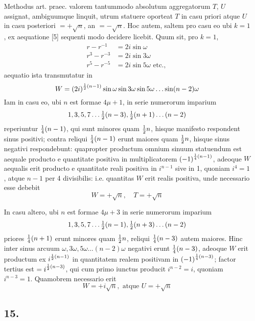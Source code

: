 \documentclass[twoside,12pt]{memoir}
\let\oldfrac\frac
\def\frac#1#2{\mathchoice{\tfrac{#1}{#2}}{\oldfrac{#1}{#2}}{\genfrac{}{}{}{2}{#1}{#2\mathstrut}}{\genfrac{}{}{}{3}{#1}{#2\mathstrut}}}
\begin{document}
Methodus art. praec. valorem tantummodo absolutum aggregatorum \(T\), \(U\) assignat, ambiguumque linquit, utrum statuere oporteat \(T\) in casu priori atque \(U\) in casu posteriori \(=+ \surd n\), an \(=-\surd n\). Hoc autem, saltem pro casu eo ubi \(k=1\), ex aequatione [5] sequenti modo decidere licebit. Quum sit, pro \(k=1\),\pagebreak%
\[\begin{aligned}
r-r^{-1} & =2 i \sin \omega \\
r^{3}-r^{-3} & =2 i \sin 3 \omega \\
r^{5}-r^{-5} & =2 i \sin 5 \omega \text{ etc., }
\end{aligned}\]
aequatio ista transmutatur in
\[W=(2 i)^{\frac{1}{2}(n-1)} \sin \omega \sin 3 \omega \sin 5 \omega \ldots \sin (n-2) \omega\]
Iam in casu eo, ubi \(n\) est formae \(4 \mu+1\), in serie numerorum imparium
\[1,3,5,7 \ldots \frac{1}{2}(n-3), \frac{1}{2}(n+1) \ldots(n-2)\]
reperiuntur \(\frac{1}{4}(n-1)\), qui sunt minores quam \(\frac{1}{2} n\), hisque manifesto respondent sinus positivi; contra reliqui \(\frac{1}{4}(n-1)\) erunt maiores quam \(\frac{1}{2} n\), hisque sinus negativi respondebunt: quapropter productum omnium sinuum statuendum est aequale producto e quantitate positiva in multiplicatorem \((-1)^{\frac{1}{4}(n-1)}\), adeoque \(W\) aequalis erit producto e quantitate reali positiva in \(i^{n-1}\) sive in 1, quoniam \(i^{4}=1\), atque \(n-1\) per 4 divisibilis: i.e. quantitas \(W\) erit realis positiva, unde necessario esse debebit
\[W=+\surd n, \quad T=+\surd n\]

In casu altero, ubi \(n\) est formae \(4 \mu+3\) in serie numerorum imparium
\[1,3,5,7 \ldots \frac{1}{2}(n-1), \frac{1}{2}(n+3) \ldots(n-2)\]
priores \(\frac{1}{4}(n+1)\) erunt minores quam \(\frac{1}{2} n\), reliqui \(\frac{1}{4}(n-3)\) autem maiores. Hinc inter sinus arcuum \(\omega, 3 \omega, 5 \omega \ldots(n-2) \omega\) negativi erunt \(\frac{1}{4}(n-3)\), adeoque \(W\) erit productum ex \(i^{\frac{1}{2}(n-1)}\) in quantitatem realem positivam in \((-1)^{\frac{1}{4}(n-3)}\); factor tertius est \(=i^{\frac{1}{2}(n-3)}\), qui cum primo iunctus producit \(i^{n-2}=i\), quoniam \(i^{n-3}=1\). Quamobrem necessario erit
\[W=+i \surd n, \text{ atque } U=+\surd n\]

\subsection*{15.}
 
\end{document}
